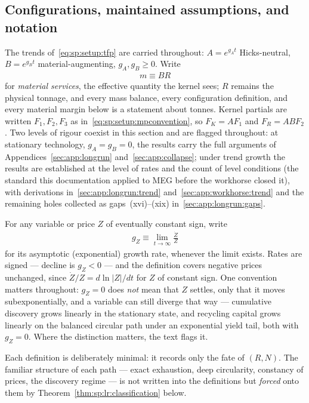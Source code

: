\subsection{Configurations, maintained assumptions, and notation}
\label{sec:sp:longrun:setup}

 The trends of~\eqref{eq:sp:setup:tfp}
are carried throughout: $A=e^{g_At}$ Hicks-neutral, $B=e^{g_Bt}$ material-augmenting,
$g_A,g_B\ge0$. Write
\begin{align}
m\equiv BR
\label{eq:sp:lr:services}
\end{align}
for \emph{material services}, the effective quantity the kernel sees; $R$ remains the physical
tonnage, and every mass balance, every configuration definition, and every material margin
below is a statement about tonnes. Kernel partials are written $F_1,F_2,F_3$ as
in~\eqref{eq:sp:setup:mpconvention}, so $F_K=AF_1$ and $F_R=ABF_2$. Two levels of rigour
coexist in this section and are flagged throughout: at stationary technology, $g_A=g_B=0$,
the results carry the full arguments of Appendices~\ref{sec:app:longrun}
and~\ref{sec:app:collapse}; under trend growth the results are established at the level of
rates and the count of level conditions (the standard this documentation applied to MEG
before the workhorse closed it), with derivations in~\ref{sec:app:longrun:trend}
and~\ref{sec:app:workhorse:trend} and the remaining holes collected as
gaps~(xvi)--(xix) in~\ref{sec:app:longrun:gaps}.

 For any variable or price $Z$ of eventually constant sign, write
\begin{align}
g_Z\equiv\lim_{t\to\infty}\frac{\dot Z}{Z}
\label{eq:sp:lr:gZ}
\end{align}
for its asymptotic (exponential) growth rate, whenever the limit exists. Rates are signed ---
decline is $g_Z<0$ --- and the definition covers negative prices unchanged, since
$\dot Z/Z=d\ln\left|Z\right|/dt$ for $Z$ of constant sign. One convention matters throughout:
$g_Z=0$ does \emph{not} mean that $Z$ settles, only that it moves subexponentially, and a
variable can still diverge that way --- cumulative discovery grows linearly in the stationary
state, and recycling capital grows linearly on the balanced circular path under an exponential
yield tail, both with $g_Z=0$. Where the distinction matters, the text flags it.

 Each definition is deliberately minimal: it records only
the fate of $\left(R,N\right)$. The familiar structure of each path --- exact exhaustion, deep
circularity, constancy of prices, the discovery regime --- is not written into the definitions
but \emph{forced} onto them by Theorem~\ref{thm:sp:lr:classification} below.

